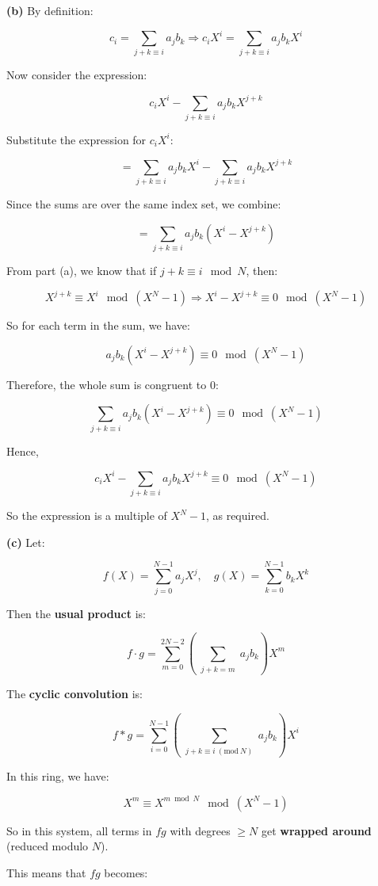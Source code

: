 \documentclass[a4paper,12pt]{article}
\begin{document}
    \textbf{(b)} By definition:

\[
c_i = \sum_{j + k \equiv i} a_j b_k
\Rightarrow
c_i X^i = \sum_{j + k \equiv i} a_j b_k X^i
\]

Now consider the expression:

\[
c_i X^i - \sum_{j + k \equiv i} a_j b_k X^{j+k}
\]

Substitute the expression for \(c_i X^i\):

\[
= \sum_{j + k \equiv i} a_j b_k X^i - \sum_{j + k \equiv i} a_j b_k X^{j+k}
\]

Since the sums are over the same index set, we combine:

\[
= \sum_{j + k \equiv i} a_j b_k (X^i - X^{j+k})
\]

From part (a), we know that if \(j + k \equiv i \mod N\), then:

\[
X^{j+k} \equiv X^i \mod (X^N - 1)
\Rightarrow X^i - X^{j+k} \equiv 0 \mod (X^N - 1)
\]

So for each term in the sum, we have:

\[
a_j b_k (X^i - X^{j+k}) \equiv 0 \mod (X^N - 1)
\]

Therefore, the whole sum is congruent to 0:

\[
\sum_{j + k \equiv i} a_j b_k (X^i - X^{j+k}) \equiv 0 \mod (X^N - 1)
\]

Hence,

\[
c_i X^i - \sum_{j + k \equiv i} a_j b_k X^{j+k}
\equiv 0 \mod (X^N - 1)
\]

So the expression is a multiple of \(X^N - 1\), as required.

    \textbf{(c)} Let:

\[
f(X) = \sum_{j=0}^{N-1} a_j X^j, \quad
g(X) = \sum_{k=0}^{N-1} b_k X^k
\]

Then the \textbf{usual product} is:

\[
f \cdot g = \sum_{m=0}^{2N-2} \left( \sum_{\substack{j + k = m}} a_j b_k \right) X^m
\]

The \textbf{cyclic convolution} is:

\[
f * g = \sum_{i=0}^{N-1} \left( \sum_{\substack{j + k \equiv i \ (\mathrm{mod}\ N)}} a_j b_k \right) X^i
\]

In this ring, we have:

\[
X^m \equiv X^{m \bmod N} \mod (X^N - 1)
\]

So in this system, all terms in \(fg\) with degrees \(\geq N\) get
\textbf{wrapped around} (reduced modulo \(N\)).

This means that \(fg\) becomes:
\end{document}
